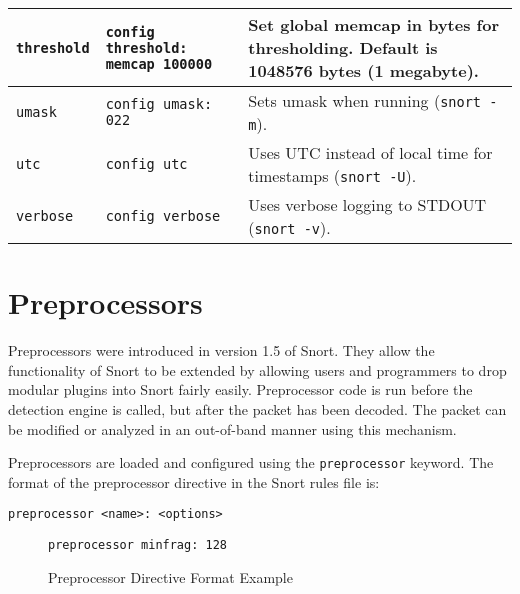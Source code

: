 \documentclass[english]{report}
\newenvironment{note}{
\samepage
    \vspace{10pt}{\textsf{
        {\hspace{7pt}\Huge{$\triangle$\hspace{-12.5pt}{\Large{$^!$}}}}\hspace{5pt}
        {\Large{NOTE}}
    }
    }
   \begin{center}
    \par\vspace{-17pt}

    \begin{lrbox}{\savepar}
    \begin{minipage}[r]{6in}
}
{
    \end{minipage}
    \end{lrbox}
    \fbox{
        \usebox{
            \savepar
	}
    }
    \par\vskip10pt
    \end{center}
}
\newenvironment{note}{
        \begin{rawhtml}
        <p><table border="1"><tr><td><b>
        Note:&nbsp;&nbsp;</b>
        \end{rawhtml}
}{
        \begin{rawhtml}
        </b></td></tr></table></p>
        \end{rawhtml}
}
\begin{document}
\begin{center}
\begin{longtable}{| p{2in} | p{2.25in} | p{2.25in} |}
\hline
\texttt{threshold} & \texttt{config threshold: memcap 100000} & Set global memcap in bytes for thresholding. Default is 1048576 bytes (1 megabyte). \\
\hline
\texttt{umask} & \texttt{config umask: 022} & Sets umask when running (\texttt{snort -m}). \\
\hline
\texttt{utc} & \texttt{config utc} & Uses UTC instead of local time for timestamps (\texttt{snort -U}). \\
\hline
\texttt{verbose} & \texttt{config verbose} & Uses verbose logging to STDOUT (\texttt{snort -v}). \\
\hline

\end{longtable}
\end{center}


\newpage
\section{Preprocessors}

Preprocessors were introduced in version 1.5 of Snort. They allow
the functionality of Snort to be extended by allowing users and programmers
to drop modular plugins into Snort fairly easily.
Preprocessor code is run before the detection engine is called, but
after the packet has been decoded. The packet can be modified or analyzed
in an out-of-band manner using this mechanism.

Preprocessors are loaded and configured using the {\tt preprocessor} keyword.
The format of the preprocessor directive in the Snort rules file is:

\begin{verbatim}
preprocessor <name>: <options>
\end{verbatim}

\begin{figure}[!hbpt]
\begin{verbatim}
preprocessor minfrag: 128
\end{verbatim}

\caption{\label{Preprocessor Example}Preprocessor Directive Format Example}
\end{figure}
\end{document}
